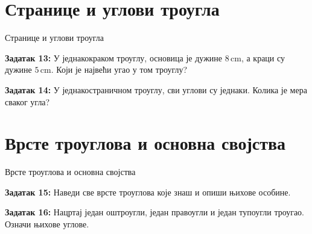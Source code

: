 \documentclass[12pt]{beamer}
\begin{document}
\section{Странице и углови троугла}
\begin{frame}{Странице и углови троугла}

\textbf{Задатак 13:}
У једнакокраком троуглу, основица је дужине
$8 \,\mathrm{cm}$, а краци су дужине $5 \,\mathrm{cm}$.
Који је највећи угао у том троуглу?

\textbf{Задатак 14:}
У једнакостраничном троуглу, сви углови су једнаки. Колика је мера сваког угла?

\end{frame}

\section{Врсте троуглова и основна својства}
\begin{frame}{Врсте троуглова и основна својства}

\textbf{Задатак 15:}
Наведи све врсте троуглова које знаш и опиши њихове особине.

\textbf{Задатак 16:}
Нацртај један оштроугли, један правоугли и један тупоугли троугао.
Означи њихове углове.

\end{frame}
\end{document}
